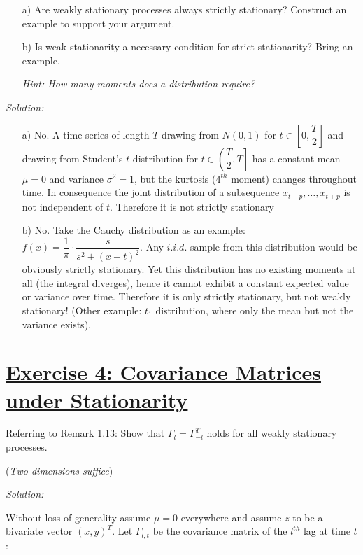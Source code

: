 \documentclass[12pt,a4paper]{article}
\newcommand{\tmpsection}[1]{}
\let\tmpsection=\section
\renewcommand{\section}[1]{\tmpsection{\underline{#1}} }
\begin{document}
\begin{itemize}
    \item[a)] Are weakly stationary processes always strictly stationary? Construct an example to support your argument.
    \item[b)] Is weak stationarity a necessary condition for strict stationarity? Bring an example.
    \item[] \textit{Hint: How many moments does a distribution require?}
\end{itemize}

\emph{Solution:}

\begin{itemize}
    \item[a)] No. A time series of length $T$ drawing from $N(0, 1)$ for $t \in \left[0, \dfrac{T}{2} \right]$ and drawing from Student’s $t$-distribution for $t \in \left(\dfrac{T}{2}, T \right]$ has a constant mean $\mu = 0$ and variance $\sigma^2 = 1$, but the kurtosis ($4^{th}$ moment) changes throughout time. In consequence the joint distribution of a subsequence $x_{t-p}, \ldots , x_{t+p}$ is not independent of $t$. Therefore it is not strictly stationary
    \item[b)] No. Take the Cauchy distribution as an example: $f(x) = \dfrac{1}{\pi} \cdot \dfrac{s}{s^2 + (x -t)^2}$. Any $i.i.d.$ sample from this distribution would be obviously strictly stationary. Yet this distribution has no existing moments at all (the integral diverges), hence it cannot exhibit a constant expected value or variance over time. Therefore it is only strictly stationary, but not weakly stationary! (Other example: $t_1$ distribution, where only the mean but not the variance exists).
\end{itemize}

\hypertarget{exercise-4-covariance-matrices-under-stationarity}{%
\section{Exercise 4: Covariance Matrices under
Stationarity}\label{exercise-4-covariance-matrices-under-stationarity}}

Referring to Remark 1.13: Show that \(\Gamma_l = \Gamma^{T}_{-l}\) holds
for all weakly stationary processes.

(\emph{Two dimensions suffice})

\emph{Solution:}

Without loss of generality assume \(\mu = 0\) everywhere and assume
\(z\) to be a bivariate vector \((x,y)^T\). Let \(\Gamma_{l,t}\) be the
covariance matrix of the \(l^{th}\) lag at time \(t\):
\end{document}
